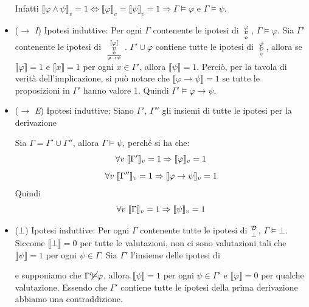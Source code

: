 \documentclass[a4paper,12pt]{report}
\newcommand\val[1]{\llbracket#1\rrbracket}
\begin{document}
\begin{itemize}
Infatti $\val{\varphi \wedge \psi}_v = 1\iff \val{\varphi}_v = \val{\psi}_v = 1 \Rightarrow \Gamma \vDash \varphi$ e $\Gamma \vDash \psi$. 
\item (\emph{$\to$ I}) Ipotesi induttive: Per ogni $\Gamma$ contenente le ipotesi di $\varphi \atop{\mathcal{D} \atop \psi}$, $\Gamma \vDash \varphi$. 
Sia $\Gamma'$ contenente le ipotesi di $[\varphi] \atop{\mathcal{D} \atop \frac{\psi}{\varphi \to \psi}}$.  $\Gamma' \cup {\varphi}$ contiene tutte le ipotesi di $\varphi \atop{\mathcal{D} \atop \psi}$, allora se $\val{\varphi} = 1$ e $\val{x} = 1$ per ogni $x \in \Gamma'$, allora $\val{\psi} = 1$. 
Perci\`{o}, per la tavola di verit\`{a} dell'implicazione, si pu\`{o} notare che $\val{\varphi \to \psi} = 1$ se tutte le proposizioni in $\Gamma'$ hanno valore 1. Quindi $\Gamma' \vDash \varphi \to \psi$.
\item (\emph{$\to$ E}) Ipotesi induttive: Siano $\Gamma'$, $\Gamma''$ gli insiemi di tutte le ipotesi per la derivazione
\begin{center}
\end{center}

Sia $\Gamma = \Gamma' \cup \Gamma''$, allora $\Gamma \vDash \psi$, perch\'{e} si ha che:
\[ \forall v \thickspace  \val{\Gamma'}_v = 1 \Rightarrow \val{\varphi}_v = 1 \]
\[ \forall v \thickspace \val{\Gamma''}_v = 1 \Rightarrow \val{\varphi \to \psi}_v = 1\]
Quindi
\[ \forall v \thickspace \val{\Gamma}_v = 1 \Rightarrow \val{\psi}_v = 1 \]

\item ($\bot$) Ipotesi induttive: Per ogni $\Gamma$ contenente tutte le ipotesi di $\mathcal{D} \atop \bot$, $\Gamma \vDash \bot$. 
Siccome $\val{\bot} = 0$ per tutte le valutazioni, non ci sono valutazioni tali che $\val{\psi} = 1$ per ogni $\psi \in \Gamma$. 
Sia $\Gamma'$ l'insieme delle ipotesi di
\begin{center}
\end{center}
e supponiamo  che $\Gamma' \cancel{\vDash} \varphi$, 
allora $\val{\psi} = 1$ per ogni $\psi \in \Gamma'$ e $\val{\varphi} = 0$ per qualche valutazione. Essendo che $\Gamma'$ contiene tutte le ipotesi della prima derivazione abbiamo una contraddizione.


\end{itemize}
\end{document}
